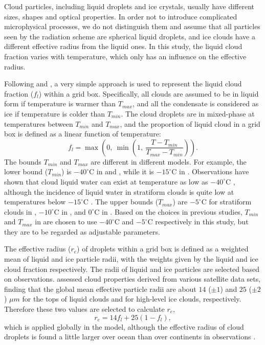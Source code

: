 Cloud particles, including liquid droplets and ice crystals, usually have different sizes, shapes and optical properties. In order not to introduce complicated microphysical processes, we do not distinguish them and assume that all particles seen by the radiation scheme are spherical liquid droplets, and ice clouds have a different effective radius from the liquid ones. In this study, the liquid cloud fraction varies with temperature, which only has an influence on the effective radius. %

Following \citet{Ose1993} and \citet{Boville2006}, a very simple approach is used to represent the liquid cloud fraction ($f_l$) within a grid box. Specifically, all clouds are assumed to be in liquid form if temperature is warmer than $T_{max}$, and all the condensate is considered as ice if temperature is colder than $T_{min}$. The cloud droplets are in mixed-phase at temperatures between $T_{min}$ and $T_{max}$, and the proportion of liquid cloud in a grid box is defined as a linear function of temperature:
\begin{equation}
	f_{l} =\max\left(0, ~\min\left(1, ~\frac{T-T_{min}}{T_{max}-T_{min}} \right)\right).
	\label{eq:liquid_frac}
\end{equation}
The bounds $T_{min}$ and $T_{max}$ are different in different models. For example, the lower bound ($T_{min}$) is $-40^{\circ}$C in \citet{Ose1993} and \citet{Boville2006}, while it is $-15^{\circ}$C  in \citet{Smith1990}. Observations have shown that cloud liquid water can exist at temperature as low as $-40^{\circ}$C \citep{Heymsfield1993}, although the incidence of liquid water in stratiform clouds is quite low at temperatures below $-15^{\circ}$C \citep{Ryan1996}. The upper bounds ($T_{max}$) are $-5^{\circ}$C for stratiform clouds in \citet{Ose1993}, $-10^{\circ}$C in \citet{Boville2006}, and $0^{\circ}$C in \citet{Smith1990}. Based on the choices in previous studies, $T_{min}$ and $T_{max}$ in  are chosen to use $-40^{\circ}$C and $-5^{\circ}$C respectively in this study, but they are to be regarded as adjustable parameters.

The effective radius ($r_{e}$) of droplets within a grid box is defined as a weighted mean of liquid and ice particle radii, with the weights given by the liquid and ice cloud fraction respectively. The radii of liquid and ice particles are selected based on observations. \citet{Stubenrauch2013} assessed cloud properties derived from various satellite data sets, finding that the global mean effective particle radii are about $14$ ($\pm1$) and $25$ ($\pm2$) $\mu m$ for the tops of liquid clouds and for high-level ice clouds, respectively. Therefore these two values are selected to calculate $r_e$,
\begin{equation}
	r_e = 14f_l + 25(1-f_l),
	\label{eq:Reff}
\end{equation}
which is applied globally in the model, although the effective radius of cloud droplets is found a little larger over ocean than over continents in observations \citep{Stubenrauch2013}.

